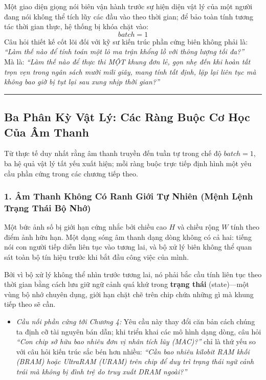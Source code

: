 \documentclass[11pt,a4paper]{article}
\begin{document}
\begin{groundbreaking}
Một giao diện giọng nói biên vận hành trước sự hiện diện vật lý của một người đang nói không thể tích lũy các đầu vào theo thời gian; để bảo toàn tính tương tác thời gian thực, hệ thống bị khóa chặt vào:
\[
batch = 1
\]
Câu hỏi thiết kế cốt lõi đối với kỹ sư kiến trúc phần cứng biên không phải là: \emph{``Làm thế nào để tính toán một lô ma trận khổng lồ với thông lượng tối đa?''} \\
Mà là: \emph{``Làm thế nào để thực thi MỘT khung đơn lẻ, gọn nhẹ đến khi hoàn tất trọn vẹn trong ngân sách mười mili giây, mang tính tất định, lặp lại liên tục mà không bao giờ bị tụt lại sau xung nhịp thời gian?''}
\end{groundbreaking}

\medskip
\hrule
\medskip

\subsection*{Ba Phân Kỳ Vật Lý: Các Ràng Buộc Cơ Học Của Âm Thanh}

Từ thực tế duy nhất rằng âm thanh truyền đến tuần tự trong chế độ $batch = 1$, ba hệ quả vật lý tất yếu xuất hiện; mỗi ràng buộc trực tiếp định hình một yêu cầu phần cứng trong các chương tiếp theo.

\subsubsection*{1. Âm Thanh Không Có Ranh Giới Tự Nhiên (Mệnh Lệnh Trạng Thái Bộ Nhớ)}
Một bức ảnh số bị giới hạn cứng nhắc bởi chiều cao $H$ và chiều rộng $W$ tính theo điểm ảnh hữu hạn. Một dạng sóng âm thanh dạng dòng không có cả hai: tiếng nói con người tiếp diễn liên tục vào tương lai, và bộ xử lý biên không thể quan sát toàn bộ tín hiệu trước khi bắt đầu công việc của mình.

Bởi vì bộ xử lý không thể nhìn trước tương lai, nó phải bắc cầu tính liên tục theo thời gian bằng cách lưu giữ ngữ cảnh quá khứ trong \textbf{trạng thái} (state)---một vùng bộ nhớ chuyên dụng, giới hạn chặt chẽ trên chip chứa những gì mà khung tiếp theo sẽ cần.
\begin{itemize}
    \item \emph{Cầu nối phần cứng tới Chương 4:} Yêu cầu này thay đổi căn bản cách chúng ta định cỡ tài nguyên bán dẫn; khi triển khai các mô hình dạng dòng, câu hỏi \emph{``Con chip sở hữu bao nhiêu đơn vị nhân tích lũy (MAC)?''} chỉ là thứ yếu so với câu hỏi kiến trúc sắc bén hơn nhiều: \emph{``Cần bao nhiêu kilobit RAM khối (BRAM) hoặc UltraRAM (URAM) trên chip để duy trì trạng thái ngữ cảnh trái mà không bị đình trệ do truy xuất DRAM ngoài?''}
\end{itemize}
\end{document}
